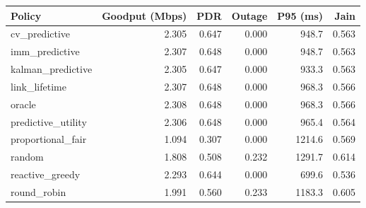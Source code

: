 \begin{tabular}{lrrrrr}
\toprule
Policy & Goodput (Mbps) & PDR & Outage & P95 (ms) & Jain \\
\midrule
cv\_predictive & 2.305 & 0.647 & 0.000 & 948.7 & 0.563 \\
imm\_predictive & 2.307 & 0.648 & 0.000 & 948.7 & 0.563 \\
kalman\_predictive & 2.305 & 0.647 & 0.000 & 933.3 & 0.563 \\
link\_lifetime & 2.307 & 0.648 & 0.000 & 968.3 & 0.566 \\
oracle & 2.308 & 0.648 & 0.000 & 968.3 & 0.566 \\
predictive\_utility & 2.306 & 0.648 & 0.000 & 965.4 & 0.564 \\
proportional\_fair & 1.094 & 0.307 & 0.000 & 1214.6 & 0.569 \\
random & 1.808 & 0.508 & 0.232 & 1291.7 & 0.614 \\
reactive\_greedy & 2.293 & 0.644 & 0.000 & 699.6 & 0.536 \\
round\_robin & 1.991 & 0.560 & 0.233 & 1183.3 & 0.605 \\
\bottomrule
\end{tabular}
